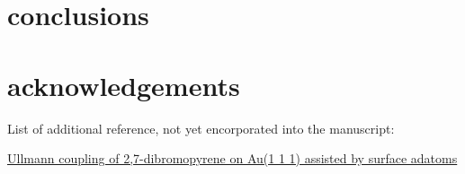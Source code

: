 \documentclass[%
 reprint,
 amsmath,amssymb,
 aps,
prb,
]{revtex4-1}
\begin{document}
\section{conclusions}

\section{acknowledgements}






List of additional reference, not yet encorporated into the manuscript:

\href{https://doi.org/10.1016/j.apsusc.2020.145797}{Ullmann coupling of 2,7-dibromopyrene on Au(1 1 1) assisted by surface adatoms}










\nocite{*}

\end{document}

